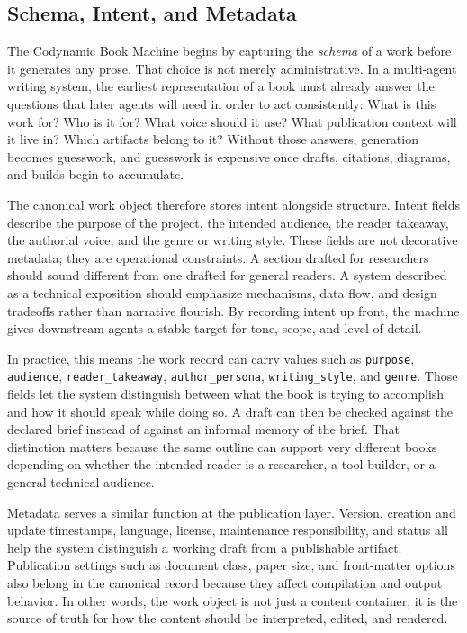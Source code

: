 \documentclass[11pt]{article}
\begin{document}
\subsection{Schema, Intent, and Metadata}


The Codynamic Book Machine begins by capturing the \emph{schema} of a work before it generates any prose. That choice is not merely administrative. In a multi-agent writing system, the earliest representation of a book must already answer the questions that later agents will need in order to act consistently: What is this work for? Who is it for? What voice should it use? What publication context will it live in? Which artifacts belong to it? Without those answers, generation becomes guesswork, and guesswork is expensive once drafts, citations, diagrams, and builds begin to accumulate.

The canonical work object therefore stores intent alongside structure. Intent fields describe the purpose of the project, the intended audience, the reader takeaway, the authorial voice, and the genre or writing style. These fields are not decorative metadata; they are operational constraints. A section drafted for researchers should sound different from one drafted for general readers. A system described as a technical exposition should emphasize mechanisms, data flow, and design tradeoffs rather than narrative flourish. By recording intent up front, the machine gives downstream agents a stable target for tone, scope, and level of detail.

In practice, this means the work record can carry values such as \texttt{purpose}, \texttt{audience}, \texttt{reader\_takeaway}, \texttt{author\_persona}, \texttt{writing\_style}, and \texttt{genre}. Those fields let the system distinguish between what the book is trying to accomplish and how it should speak while doing so. A draft can then be checked against the declared brief instead of against an informal memory of the brief. That distinction matters because the same outline can support very different books depending on whether the intended reader is a researcher, a tool builder, or a general technical audience.

Metadata serves a similar function at the publication layer. Version, creation and update timestamps, language, license, maintenance responsibility, and status all help the system distinguish a working draft from a publishable artifact. Publication settings such as document class, paper size, and front-matter options also belong in the canonical record because they affect compilation and output behavior. In other words, the work object is not just a content container; it is the source of truth for how the content should be interpreted, edited, and rendered.
\end{document}
